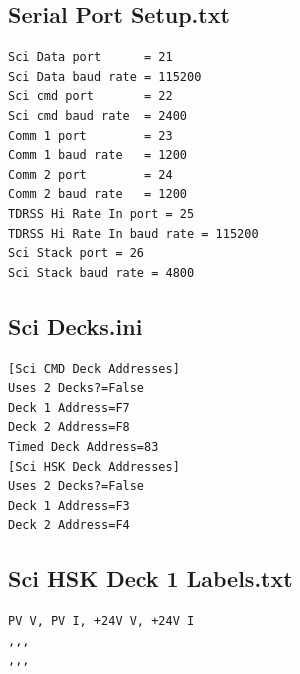 \documentclass{article}
\begin{document}
\subsection{Serial Port Setup.txt}
\begin{verbatim}
Sci Data port      = 21
Sci Data baud rate = 115200
Sci cmd port       = 22
Sci cmd baud rate  = 2400
Comm 1 port        = 23
Comm 1 baud rate   = 1200
Comm 2 port        = 24
Comm 2 baud rate   = 1200
TDRSS Hi Rate In port = 25
TDRSS Hi Rate In baud rate = 115200
Sci Stack port = 26
Sci Stack baud rate = 4800
\end{verbatim}
\subsection{Sci Decks.ini}
\begin{verbatim}
[Sci CMD Deck Addresses]
Uses 2 Decks?=False
Deck 1 Address=F7
Deck 2 Address=F8
Timed Deck Address=83
[Sci HSK Deck Addresses]
Uses 2 Decks?=False
Deck 1 Address=F3
Deck 2 Address=F4
\end{verbatim}
\subsection{Sci HSK Deck 1 Labels.txt}
\begin{verbatim}
PV V, PV I, +24V V, +24V I
,,,
,,,
\end{verbatim}
\end{document}
